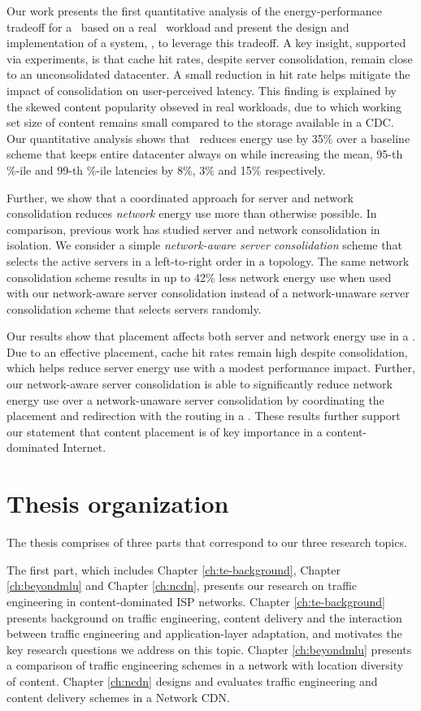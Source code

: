 Our work presents the first quantitative analysis of the energy-performance tradeoff for a \cdc\ based on a real \cdc\ workload and present the design and implementation of a system, \shrink, to leverage this tradeoff. A key insight, supported via experiments, is that cache hit rates, despite server consolidation, remain close to an unconsolidated datacenter. A small reduction in hit rate helps mitigate the impact of consolidation on user-perceived latency. This finding is explained by the skewed content popularity obseved in real workloads, due to which working set size of content remains small compared to the storage available in a CDC. Our quantitative analysis shows that \shrink\ reduces energy use by 35\% over a baseline scheme that keeps entire datacenter always on while increasing the mean, 95-th \%-ile and 99-th \%-ile latencies by 8\%, 3\% and 15\% respectively. 

Further, we show that a coordinated approach for server and network consolidation reduces \emph{network} energy use more than otherwise possible. In comparison, previous work has studied server and network consolidation in isolation. We consider a simple \emph{network-aware server consolidation} scheme that selects the active servers in a left-to-right order in a topology. The same network consolidation scheme results in up to 42\% less network energy use when used with our network-aware server consolidation instead of a network-unaware server consolidation scheme that selects servers randomly. 

Our results show that placement affects both server and network energy use in a \cdc. Due to an effective placement, cache hit rates remain high despite consolidation, which helps reduce server energy use with a modest performance impact. Further, our network-aware server consolidation is able to significantly reduce network energy use over a network-unaware server consolidation by coordinating the placement and redirection with the routing in a \cdc. These results further support our statement that content placement is of key importance in a content-dominated Internet.


\section{Thesis organization}

The thesis comprises of three parts that correspond to our three research topics.

The first part, which includes Chapter \ref{ch:te-background}, Chapter \ref{ch:beyondmlu} and Chapter \ref{ch:ncdn}, presents our research on traffic engineering in content-dominated ISP networks. Chapter \ref{ch:te-background} presents background on traffic engineering, content delivery and the interaction between traffic engineering and application-layer adaptation, and motivates the key research questions we address on this topic. Chapter \ref{ch:beyondmlu} presents a comparison of traffic engineering schemes in a network with location diversity of content. Chapter \ref{ch:ncdn} designs and evaluates traffic engineering and content delivery schemes in a Network CDN.

